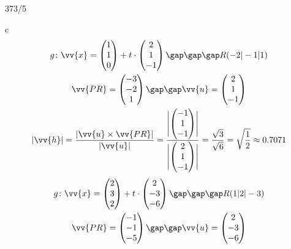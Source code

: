 \begin{exercise}{373/5}
  \item [c]
  \begin{gather*}
    g \colon \vv{x} = \begin{pmatrix}1 \\ 1 \\ 0\end{pmatrix} + t \cdot \begin{pmatrix}2 \\ 1 \\ -1\end{pmatrix} \gap\gap\gap R(-2|-1|1) \\
    \vv{PR} = \begin{pmatrix}-3 \\ -2 \\ 1\end{pmatrix} \gap\gap \vv{u} = \begin{pmatrix}2 \\ 1 \\ -1\end{pmatrix} \\
    |\vv{h}| = \frac{|\vv{u} \times \vv{PR}|}{|\vv{u}|} = \frac{\Biggl|\begin{pmatrix}-1 \\ 1 \\ -1\end{pmatrix}\Biggr|}{\Biggl|\begin{pmatrix}2 \\ 1 \\ -1\end{pmatrix}\Biggr|} = \frac{\sqrt{3}}{\sqrt{6}} = \sqrt{\frac{1}{2}} \approx 0.7071
  \end{gather*}
  \begin{gather*}
    g \colon \vv{x} = \begin{pmatrix}2 \\ 3 \\ 2\end{pmatrix} + t \cdot \begin{pmatrix}2 \\ -3 \\ -6\end{pmatrix} \gap\gap\gap R(1|2|-3) \\
    \vv{PR} = \begin{pmatrix}-1 \\ -1 \\ -5\end{pmatrix} \gap\gap \vv{u} = \begin{pmatrix}2 \\ -3 \\ -6\end{pmatrix} \\

\end{gather*}
\end{exercise}
